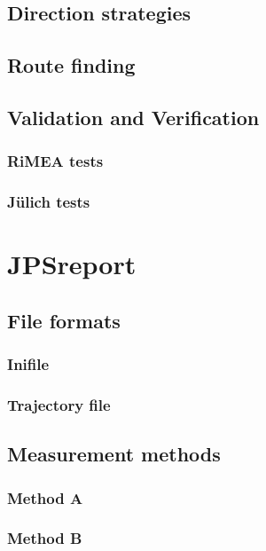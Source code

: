 \documentclass[%
paper=A4,					%
twoside=true,				%
openright,					%
parskip=full,				%
chapterprefix=true,			%
11pt,						%
headings=normal,			%
bibliography=totoc,			%
listof=totoc,				%
titlepage=on,				%
captions=tableabove,		%
draft=false,				%
]{scrreprt}%
\begin{document}
\section{Direction strategies}

\newpage
\section{Route finding}

\newpage
\section{Validation and Verification}
\subsection{RiMEA tests}

\newpage
\subsection{J\"ulich tests}

\chapter{JPSreport}
\section{File formats}
\subsection{Inifile}

\newpage
\subsection{Trajectory file}


\section{Measurement methods}
\subsection{Method A}

\newpage
\subsection{Method B}

\newpage
\end{document}
